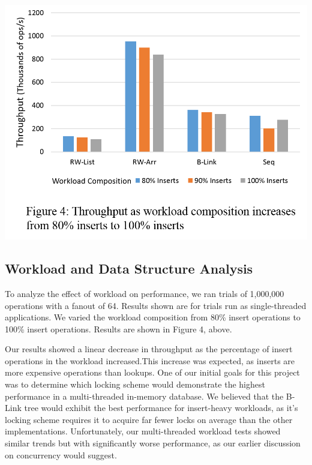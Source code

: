 \documentclass{sig-alternate}
\begin{document}
\vspace{3mm}
\hspace{-10mm}
\includegraphics[width=\linewidth]{WorkloadGraph}
\vspace{3mm}

\subsection{Workload and Data Structure Analysis}
To analyze the effect of workload on performance, we ran trials of 1,000,000 operations with a fanout of 64. Results shown are for trials run as single-threaded applications. We varied the workload composition from 80\% insert operations to 100\% insert operations. Results are shown in Figure 4, above.

Our results showed a linear decrease in throughput as the percentage of insert operations in the workload increased.This increase was expected, as inserts are more expensive operations than lookups. One of our initial goals for this project was to determine which locking scheme would demonstrate the highest performance in a multi-threaded in-memory database. We believed that the B-Link tree would exhibit the best performance for insert-heavy workloads, as it's locking scheme requires it to acquire far fewer locks on average than the other implementations. Unfortunately, our multi-threaded workload tests showed similar trends but with significantly worse performance, as our earlier discussion on concurrency would suggest. 
\end{document}
